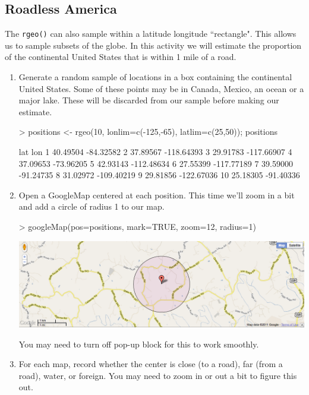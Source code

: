 \subsection{Roadless America}

The \verb!rgeo()! can also sample within a latitude longitude ``rectangle".
This allows us to sample subsets of the globe.  In this activity we will estimate 
the proportion of the continental United States that is within 1 mile of a road.

\begin{enumerate}
\item
Generate a random sample of locations in a box containing the continental United States.
Some of these points may be in Canada, Mexico, an ocean or a major lake.  These 
will be discarded from our sample before making our estimate.
\begin{Schunk}
\begin{Sinput}
> positions <- rgeo(10, lonlim=c(-125,-65), latlim=c(25,50)); positions
\end{Sinput}
\begin{Soutput}
        lat        lon
1  40.49504  -84.32582
2  37.89567 -118.64393
3  29.91783 -117.66907
4  37.09653  -73.96205
5  42.93143 -112.48634
6  27.55399 -117.77189
7  39.59000  -91.24735
8  31.02972 -109.40219
9  29.81856 -122.67036
10 25.18305  -91.40336
\end{Soutput}
\end{Schunk}

\item
Open a GoogleMap centered at each position.  This time we'll zoom in a bit and add 
a circle of radius 1 to our map.

\begin{Schunk}
\begin{Sinput}
> googleMap(pos=positions, mark=TRUE, zoom=12, radius=1)
\end{Sinput}
\end{Schunk}


\begin{center}
\includegraphics[width=.8\textwidth]{images/google-roadless}
\end{center}
You may need to turn off pop-up block for this to work smoothly.
\item
For each map, record whether the center is close (to a road), far (from a road), water, or foreign.
You may need to zoom in or out a bit to figure this out.

\end{enumerate}

